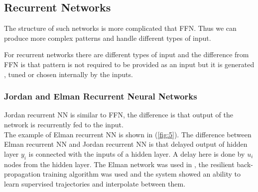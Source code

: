 \documentclass[12pt,a4paper]{report}
\begin{document}
			\subsection{Recurrent Networks}
				The structure of such networks is more complicated that FFN. Thus we can produce more complex patterns and handle different types of input.
				
				For recurrent networks there are different types of input and the difference from FFN is that pattern is not required to be provided as an input but it is generated , tuned or chosen internally by the inputs. 
				
				\subsubsection{Jordan and Elman Recurrent Neural Networks}
					Jordan recurrent NN is similar to FFN, the difference is that output of the network is recurrently fed to the input.\\
					The example of Elman recurrent NN is shown in (\cref{fig:5}). The difference between Elman recurrent NN and Jordan recurrent NN is that delayed output of hidden layer $y_i$ is connected with the inputs of a hidden layer. A delay here is done by $u_i$ nodes from the hidden layer. The Elman network was used in \cite{berns1995neural}, the resilient back-propagation training algorithm was used and the system showed an ability to learn supervised trajectories and interpolate between them.
					
\end{document}
